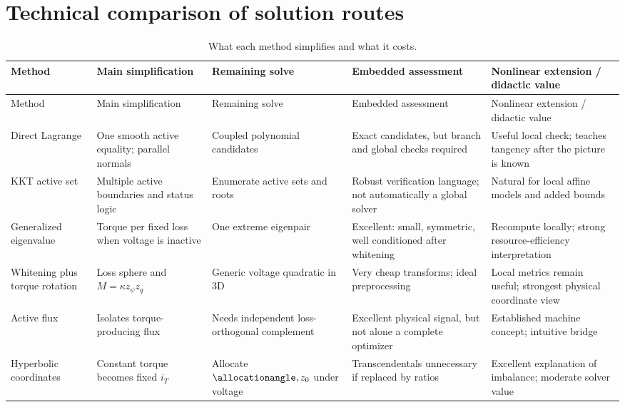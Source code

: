 \section{Technical comparison of solution routes}
\label{sec:comparison}

\begin{landscape}
\scriptsize\sloppy

\setlength{\tabcolsep}{2.5pt}
\begin{longtable}{@{}>{\raggedright\arraybackslash}p{.13\linewidth}>{\raggedright\arraybackslash}p{.18\linewidth}>{\raggedright\arraybackslash}p{.15\linewidth}>{\raggedright\arraybackslash}p{.20\linewidth}>{\raggedright\arraybackslash}p{.22\linewidth}@{}}
\caption{What each method simplifies and what it costs.}\label{tab:comparison}\\
\toprule
Method & Main simplification & Remaining solve & Embedded assessment & Nonlinear extension / didactic value\\
\midrule
\endfirsthead
\toprule
Method & Main simplification & Remaining solve & Embedded assessment & Nonlinear extension / didactic value\\
\midrule
\endhead
Direct Lagrange & One smooth active equality; parallel normals & Coupled polynomial candidates & Exact candidates, but branch and global checks required & Useful local check; teaches tangency after the picture is known\\
KKT active set & Multiple active boundaries and status logic & Enumerate active sets and roots & Robust verification language; not automatically a global solver & Natural for local affine models and added bounds\\
Generalized eigenvalue & Torque per fixed loss when voltage is inactive & One extreme eigenpair & Excellent: small, symmetric, well conditioned after whitening & Recompute locally; strong resource-efficiency interpretation\\
Whitening plus torque rotation & Loss sphere and \(M=\kappa z_\psi z_q\) & Generic voltage quadratic in 3D & Very cheap transforms; ideal preprocessing & Local metrics remain useful; strongest physical coordinate view\\
Active flux & Isolates torque-producing flux & Needs independent loss-orthogonal complement & Excellent physical signal, but not alone a complete optimizer & Established machine concept; intuitive bridge\\
Hyperbolic coordinates & Constant torque becomes fixed \(i_T\) & Allocate \(\allocationangle,z_0\) under voltage & Transcendentals unnecessary if replaced by ratios & Excellent explanation of imbalance; moderate solver value\\

\end{longtable}
\end{landscape}

